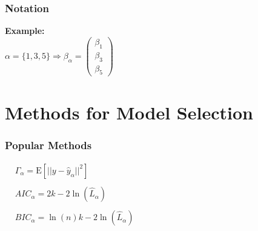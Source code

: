 \documentclass[20pt,mathserif,xcolor=dvipsnames]{beamer}
\newcommand{\E}{\mathrm{E}}
\begin{document}
\begin{frame}
\frametitle{Notation}
{\bfseries Example:}\\\vspace*{8pt}
$\alpha=\{1,3,5\}\Rightarrow \beta_\alpha=\begin{pmatrix}
\beta_1\\\beta_3\\\beta_5
\end{pmatrix}$
\end{frame}

\thispagestyle{empty}
\section{Methods for Model Selection}

\begin{frame}
\frametitle{Popular Methods}

\begin{align*}
&\Gamma_\alpha=\E\left[||y-\hat{y}_\alpha||^2\right]
\\\\
&AIC_\alpha = 2k - 2\ln(\hat{L}_\alpha)\hspace{30cm}
\\\\
&BIC_\alpha = \ln(n)k - 2\ln(\hat{L}_\alpha)
\end{align*}
\end{frame}
\end{document}
